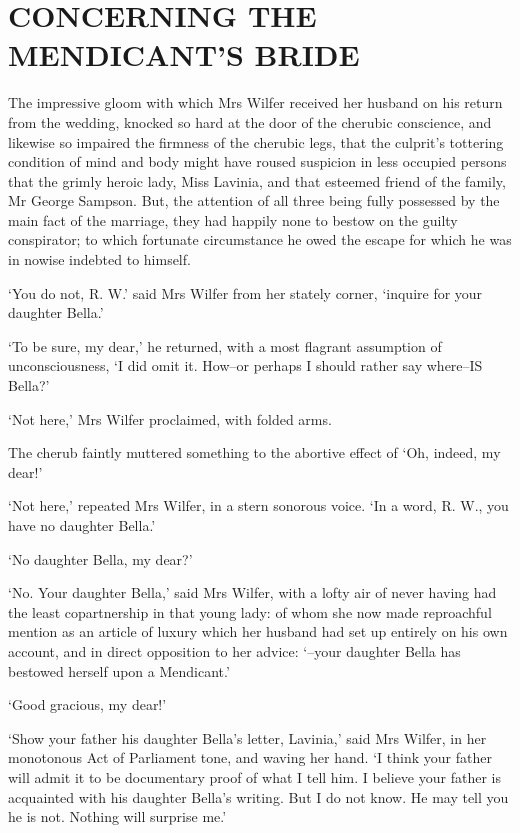
\chapter{CONCERNING THE MENDICANT’S BRIDE}

The impressive gloom with which Mrs Wilfer received her husband on his
return from the wedding, knocked so hard at the door of the cherubic
conscience, and likewise so impaired the firmness of the cherubic legs,
that the culprit’s tottering condition of mind and body might have
roused suspicion in less occupied persons that the grimly heroic lady,
Miss Lavinia, and that esteemed friend of the family, Mr George Sampson.
But, the attention of all three being fully possessed by the main
fact of the marriage, they had happily none to bestow on the guilty
conspirator; to which fortunate circumstance he owed the escape for
which he was in nowise indebted to himself.

‘You do not, R. W.’ said Mrs Wilfer from her stately corner, ‘inquire
for your daughter Bella.’

‘To be sure, my dear,’ he returned, with a most flagrant assumption of
unconsciousness, ‘I did omit it. How--or perhaps I should rather say
where--IS Bella?’

‘Not here,’ Mrs Wilfer proclaimed, with folded arms.

The cherub faintly muttered something to the abortive effect of ‘Oh,
indeed, my dear!’

‘Not here,’ repeated Mrs Wilfer, in a stern sonorous voice. ‘In a word,
R. W., you have no daughter Bella.’

‘No daughter Bella, my dear?’

‘No. Your daughter Bella,’ said Mrs Wilfer, with a lofty air of never
having had the least copartnership in that young lady: of whom she now
made reproachful mention as an article of luxury which her husband had
set up entirely on his own account, and in direct opposition to her
advice: ‘--your daughter Bella has bestowed herself upon a Mendicant.’

‘Good gracious, my dear!’

‘Show your father his daughter Bella’s letter, Lavinia,’ said Mrs
Wilfer, in her monotonous Act of Parliament tone, and waving her hand.
‘I think your father will admit it to be documentary proof of what I
tell him. I believe your father is acquainted with his daughter Bella’s
writing. But I do not know. He may tell you he is not. Nothing will
surprise me.’

